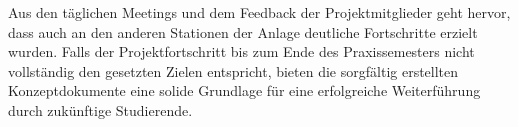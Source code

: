 Aus den täglichen Meetings und dem Feedback der Projektmitglieder geht hervor, dass auch an den anderen Stationen der Anlage deutliche 
Fortschritte erzielt wurden. Falls der Projektfortschritt bis zum Ende des Praxissemesters nicht vollständig den gesetzten Zielen entspricht, 
bieten die sorgfältig erstellten Konzeptdokumente eine solide Grundlage für eine erfolgreiche Weiterführung durch zukünftige Studierende.


